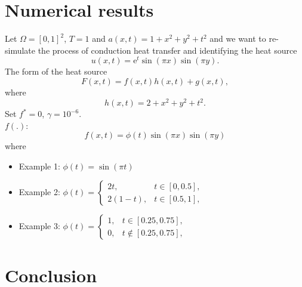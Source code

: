 \documentclass[]{article}
\begin{document}
\section{Numerical results}
Let $\Omega=[0, 1]^2$, $T=1$ and
$a(x, t)=1+x^2+y^2+t^2$ and we want to re-simulate the process of conduction heat transfer and identifying the heat source
$$u(x, t)=\text{e}^t\sin(\pi x) \sin(\pi y).$$
The form of the heat source
$$F(x, t)=f(x, t)h(x, t)+g(x, t),$$
where
$$h(x, t)=2+x^2+y^2+t^2.$$
Set $f^*=0$, $\gamma=10^{-6}$.
\\
$f(.)$:
$$f(x, t)=\phi(t)\sin(\pi x) \sin(\pi y)$$
where
\begin{itemize}
	\item Example 1: $\phi(t)=\sin(\pi t)$
	\item Example 2: 
	$\phi(t)=
	\begin{cases}
	2t, & t\in [0, 0.5],\\
	2(1-t), & t \in [0.5, 1],
	\end{cases}$
	\item Example 3:
	$\phi(t)=
	\begin{cases}
	1, & t\in [0.25, 0.75],\\
	0, & t \notin [0.25, 0.75],
	\end{cases}$
\end{itemize}

\section{Conclusion}

{}

\end{document}

